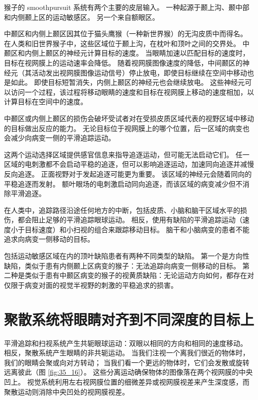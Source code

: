 猴子的 smoothpursuit 系统有两个主要的皮层输入。 一种起源于颞上沟、颞中部和内侧颞上区的运动敏感区。 另一个来自额眼区。

中颞区和内侧上颞区因其位于猫头鹰猴（一种新世界猴）的无沟皮质中而得名。 在人类和旧世界猴子中，这些区域位于颞上沟，在枕叶和顶叶之间的交界处。 中颞区和内侧上颞区的神经元计算目标的速度。 当眼睛加速以匹配目标的速度时，目标在视网膜上的运动速率会降低。 随着视网膜图像速度的降低，中间颞区的神经元（其活动发出视网膜图像运动信号）停止放电，即使目标继续在空间中移动也是如此。 即使目标短暂消失，内侧上颞区的神经元也会继续放电。 这些神经元可以访问一个过程，该过程将移动眼睛的速度和目标在视网膜上移动的速度相加，以计算目标在空间中的速度。

中颞区或内侧上颞区的损伤会破坏受试者对在受损皮质区域代表的视野区域中移动的目标做出反应的能力。 无论目标位于视网膜上的哪个位置，后一区域的病变也会减少向病变一侧的平滑追踪运动。

这两个运动选择区域提供感官信息来指导追逐运动，但可能无法启动它们。 任一区域的电刺激都不会启动平稳的追逐，但可以影响追逐运动，加速同向追逐并减慢反向追逐。 正面视野对于发起追逐可能更为重要。 该区域的神经元会随着同向的平稳追逐而发射。 额叶眼场的电刺激启动同向追逐，而该区域的病变减少但不消除平滑追逐。

在人类中，追踪路径沿途任何地方的中断，包括皮质、小脑和脑干区域水平的损伤，都会阻止足够的平滑追踪眼球运动。 相反，使用有缺陷的平滑追踪运动（速度小于目标速度）和小扫视的组合来跟踪移动目标。 脑干和小脑病变的患者不能追求向病变一侧移动的目标。

包括运动敏感区域在内的顶叶缺陷患者有两种不同类型的缺陷。 第一个是方向性缺陷，类似于患有内侧颞上区病变的猴子：无法追踪向病变一侧移动的目标。 第二种是类似于患有中颞区病变的猴子的视黄质缺陷：无论运动方向如何，都存在对仅限于病变对面的视觉半视野的刺激的平稳追求的损害。


\section{聚散系统将眼睛对齐到不同深度的目标上}
平滑追踪和扫视系统产生共轭眼球运动：双眼以相同的方向和相同的速度移动。 相反，聚散系统产生眼睛的非共轭运动。 当我们注视一个离我们很近的物体时，我们的眼睛会聚或向对方转动； 
当我们看一个更远的物体时，它们会发散或旋转远离彼此（图 \ref{fig:35_16}）。 
这些分离运动确保物体的图像落在两个视网膜的中央凹上。 视觉系统利用左右视网膜位置的细微差异或视网膜视差来产生深度感，而聚散运动则消除中央凹处的视网膜视差。

